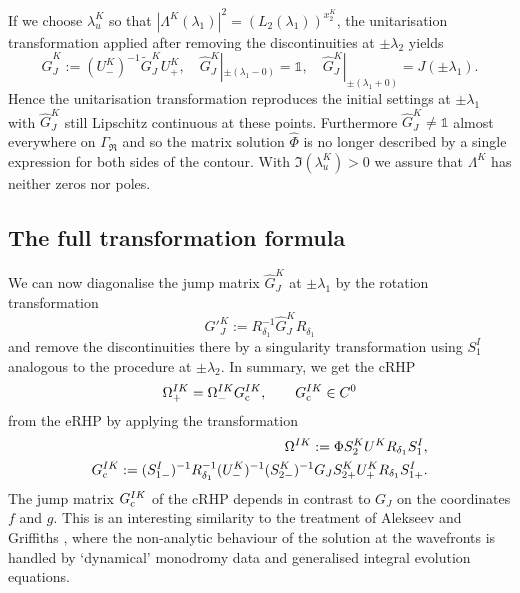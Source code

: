 \documentclass[12pt]{iopart}
\begin{document}
If we choose $\lambda^K_u$ so that $|\Lambda^K(\lambda_1)|^2=\left(L_2(\lambda_1)\right)^{x_{2}^K}$, the unitarisation transformation applied after removing the discontinuities at $\pm\lambda_2$ yields 
\begin{equation}
\hat{G}_J^K:=(U^{K}_-)^{-1}\tilde{G}_J^KU^K_+, \quad \hat{G}_J^K|_{\pm(\lambda_1-0)}=\mathbb{1}, \quad \hat{G}_J^K|_{\pm(\lambda_1+0)}=J(\pm\lambda_1).
\end{equation}
Hence the unitarisation transformation reproduces the initial settings at $\pm\lambda_1$ with $\hat{G}_J^K$ still Lipschitz continuous at these points. Furthermore $\hat{G}_J^K\neq\mathbb{1}$ almost everywhere on $\Gamma_\Re$ and so the matrix solution $\hat{\Phi}$ is no longer described by a single expression for both sides of the contour. With $\Im(\lambda^K_u)>0$ we assure that $\Lambda^K$ has neither zeros nor poles.

\subsection{The full transformation formula}

We can now diagonalise the jump matrix $\hat{G}_J^K$ at $\pm\lambda_1$ by the  rotation transformation 
\begin{equation}
{G'}_J^K:=R_{\delta_1}^{-1}\hat{G}_J^KR_{\delta_1}
\end{equation}
and remove the discontinuities there by a singularity transformation using $S^I_{1}$ analogous to the procedure at $\pm\lambda_2$. In summary, we get the cRHP
\begin{equation}
\Omega^{IK}_+=\Omega^{IK}_- G_{\rm c}^{IK}, \quad\quad G_{\rm c}^{IK}\in C^0\label{cSprung}
\end{equation}
from the eRHP  by applying the transformation
\begin{eqnarray}
\Omega^{IK}:=\Phi S^K_2 U^K R_{\delta_1} S^I_1, \label{cRHPsolution} \\
G_{\rm c}^{IK}:=(S^I_{1-})^{-1} R_{\delta_1}^{-1} (U^K_-)^{-1} (S^K_{2-})^{-1} G_J S^K_{2+} U^K_+ R_{\delta_1} S^I_{1+}. \label{cRHPjump}
\end{eqnarray}
The jump matrix $G_{\rm c}^{IK}$ of the cRHP depends in contrast to $G_J$ on the coordinates $f$ and $g$. This is an interesting similarity to the treatment of Alekseev and Griffiths \cite{Alekseev_Griffiths2004}, where the non-analytic behaviour of the solution at the wavefronts is handled by `dynamical' monodromy data and generalised integral evolution equations.
\end{document}
